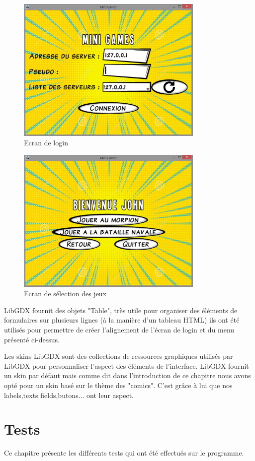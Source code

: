 \documentclass{report}
\begin{document}
\begin{figure}[H]
	\centering\includegraphics[width=9cm]{loginScreen}
	\caption{Ecran de login}
	\label{Ecran de login}
\end{figure}

\begin{figure}[H]
	\centering\includegraphics[width=9cm]{menuJeux}
	\caption{Ecran de sélection des jeux}
	\label{Ecran de selection}
\end{figure}

LibGDX fournit des objets "Table", très utile pour organiser des éléments de formulaires sur plusieurs lignes
(à la manière d'un tableau HTML) ils ont été utilisés pour permettre de créer l'alignement de l'écran de login et du menu
présenté ci-dessus.

Les skins LibGDX sont des collections de ressources graphiques utilisés par LibGDX pour personnaliser l'aspect des éléments
de l'interface. LibGDX fournit un skin par défaut mais comme dit dans l'introduction de ce chapitre nous avons opté pour un skin
basé sur le thème des "comics". C'est grâce à lui que nos labels,texts fields,butons... ont leur aspect.

\chapter{Tests}
Ce chapitre présente les différents tests qui ont été effectués sur le programme.
\end{document}
